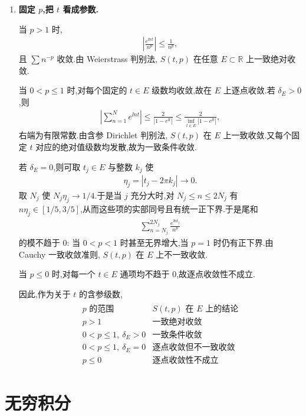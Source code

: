 \begin{exbox}
\begin{enumerate}
		\item \textbf{固定 $p$,把 $t$ 看成参数.}

		当 $p>1$ 时,
		\begin{align*}
			\left|\frac{e^{\ii nt}}{n^p}\right|\leq \frac1{n^p},
		\end{align*}
		且 $\sum n^{-p}$ 收敛.由 Weierstrass 判别法, $S(t,p)$ 在任意 $E\subset\mathbb R$ 上一致绝对收敛.

		当 $0<p\leq1$ 时,对每个固定的 $t\in E$ 级数均收敛,故在 $E$ 上逐点收敛.若 $\delta_E>0$,则
		\begin{align*}
			\left|\sum_{n=1}^N e^{\ii nt}\right|
			\leq \frac{2}{|1-e^{\ii t}|}
			\leq \frac{2}{\inf_{t\in E}|1-e^{\ii t}|},
		\end{align*}
		右端为有限常数.由含参 Dirichlet 判别法, $S(t,p)$ 在 $E$ 上一致收敛.又每个固定 $t$ 对应的绝对值级数均发散,故为一致条件收敛.

		若 $\delta_E=0$,则可取 $t_j\in E$ 与整数 $k_j$ 使
		\begin{align*}
			\eta_j=|t_j-2\pi k_j|\to0.
		\end{align*}
		取 $N_j$ 使 $N_j\eta_j\to1/4$.于是当 $j$ 充分大时,对 $N_j\leq n\leq2N_j$ 有 $n\eta_j\in[1/5,3/5]$,从而这些项的实部同号且有统一正下界.于是尾和
		\begin{align*}
			\sum_{n=N_j}^{2N_j}\frac{e^{\ii nt_j}}{n^p}
		\end{align*}
		的模不趋于 $0$: 当 $0<p<1$ 时甚至无界增大,当 $p=1$ 时仍有正下界.由 Cauchy 一致收敛准则, $S(t,p)$ 在 $E$ 上不一致收敛.

		当 $p\leq0$ 时,对每一个 $t\in E$ 通项均不趋于 $0$,故逐点收敛性不成立.

		因此,作为关于 $t$ 的含参级数,
		\begin{gather*}
		\begin{array}{c|c}
			p\text{ 的范围}&S(t,p)\text{ 在 }E\text{ 上的结论}\\ \hline
			p>1&\text{一致绝对收敛}\\[3pt]
			0<p\leq1,\ \delta_E>0&\text{一致条件收敛}\\[3pt]
			0<p\leq1,\ \delta_E=0&\text{逐点收敛但不一致收敛}\\[3pt]
			p\leq0&\text{逐点收敛性不成立}
		\end{array}
		\end{gather*}
	\end{enumerate}
\end{exbox}

\section{无穷积分}

